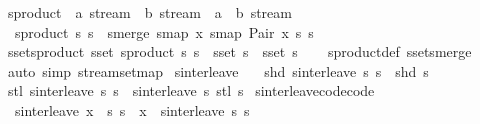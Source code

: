 \begin{isabellebody}
\ sproduct\ {\isacharcolon}{\isacharcolon}\ {\isachardoublequoteopen}{\isacharprime}a\ stream\ {\isasymRightarrow}\ {\isacharprime}b\ stream\ {\isasymRightarrow}\ {\isacharparenleft}{\isacharprime}a\ {\isasymtimes}\ {\isacharprime}b{\isacharparenright}\ stream{\isachardoublequoteclose}\ \isanewline
\ \ {\isachardoublequoteopen}sproduct\ s{}\ s{}\ {\isacharequal}\ smerge\ {\isacharparenleft}smap\ {\isacharparenleft}{\isasymlambda}x{\isachardot}\ smap\ {\isacharparenleft}Pair\ x{\isacharparenright}\ s{}{\isacharparenright}\ s{}{\isacharparenright}{\isachardoublequoteclose}\isanewline
\isanewline
{}\isamarkupfalse%
\ sset{\isacharunderscore}sproduct{\isacharcolon}\ {\isachardoublequoteopen}sset\ {\isacharparenleft}sproduct\ s{}\ s{}{\isacharparenright}\ {\isacharequal}\ sset\ s{}\ {\isasymtimes}\ sset\ s{}{\isachardoublequoteclose}\isanewline
%
\isadelimproof
\ \ %
\endisadelimproof
%
\isatagproof
{}\isamarkupfalse%
\ sproduct{\isacharunderscore}def\ sset{\isacharunderscore}smerge\ \isamarkupfalse%
\ {\isacharparenleft}auto\ simp{\isacharcolon}\ stream{\isachardot}set{\isacharunderscore}map{\isacharparenright}%
\endisatagproof
{\isafoldproof}%
%
\isadelimproof
%
\endisadelimproof
%
\isadelimdocument
%
\endisadelimdocument
%
\isatagdocument
%
\isamarkuptrue%
%
\endisatagdocument
{\isafolddocument}%
%
\isadelimdocument
%
\endisadelimdocument
{}\isamarkupfalse%
\ sinterleave\ \isanewline
\ \ {\isachardoublequoteopen}shd\ {\isacharparenleft}sinterleave\ s{}\ s{}{\isacharparenright}\ {\isacharequal}\ shd\ s{}{\isachardoublequoteclose}\isanewline
{\isacharbar}\ {\isachardoublequoteopen}stl\ {\isacharparenleft}sinterleave\ s{}\ s{}{\isacharparenright}\ {\isacharequal}\ sinterleave\ s{}\ {\isacharparenleft}stl\ s{}{\isacharparenright}{\isachardoublequoteclose}\isanewline
\isanewline
{}\isamarkupfalse%
\ sinterleave{\isacharunderscore}code{\isacharbrackleft}code{\isacharbrackright}{\isacharcolon}\isanewline
\ \ {\isachardoublequoteopen}sinterleave\ {\isacharparenleft}x\ {\isacharhash}{\isacharhash}\ s{}{\isacharparenright}\ s{}\ {\isacharequal}\ x\ {\isacharhash}{\isacharhash}\ sinterleave\ s{}\ s{}{\isachardoublequoteclose}\isanewline
%
\isadelimproof
\ \ %
\endisadelimproof

\end{isabellebody}
